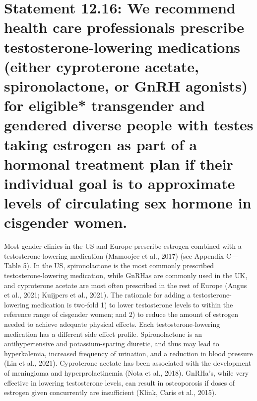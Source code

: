 \documentclass[
]{book}
\begin{document}
\hypertarget{statement-12.16-we-recommend-health-care-professionals-prescribe-testosterone-lowering-medications-either-cyproterone-acetate-spironolactone-or-gnrh-agonists-for-eligible-transgender-and-gendered-diverse-people-with-testes-taking-estrogen-as-part-of-a-hormonal-treatment-plan-if-their-individual-goal-is-to-approximate-levels-of-circulating-sex-hormone-in-cisgender-women.}{%
\section*{Statement 12.16: We recommend health care professionals prescribe testosterone-lowering medications (either cyproterone acetate, spironolactone, or GnRH agonists) for eligible* transgender and gendered diverse people with testes taking estrogen as part of a hormonal treatment plan if their individual goal is to approximate levels of circulating sex hormone in cisgender women.}\label{statement-12.16-we-recommend-health-care-professionals-prescribe-testosterone-lowering-medications-either-cyproterone-acetate-spironolactone-or-gnrh-agonists-for-eligible-transgender-and-gendered-diverse-people-with-testes-taking-estrogen-as-part-of-a-hormonal-treatment-plan-if-their-individual-goal-is-to-approximate-levels-of-circulating-sex-hormone-in-cisgender-women.}}

Most gender clinics in the US and Europe prescribe estrogen combined with a
testosterone-lowering medication (Mamoojee
et al., 2017) (see Appendix C---Table 5). In the
US, spironolactone is the most commonly prescribed testosterone-lowering medication, while
GnRHas are commonly used in the UK, and
cyproterone acetate are most often prescribed in
the rest of Europe (Angus et al., 2021; Kuijpers
et al., 2021). The rationale for adding a
testosterone-lowering medication is two-fold 1)
to lower testosterone levels to within the reference range of cisgender women; and 2) to reduce
the amount of estrogen needed to achieve adequate physical effects. Each testosterone-lowering
medication has a different side effect profile.
Spironolactone is an antihypertensive and
potassium-sparing diuretic, and thus may lead to
hyperkalemia, increased frequency of urination,
and a reduction in blood pressure (Lin et al.,
2021). Cyproterone acetate has been associated
with the development of meningioma and hyperprolactinemia (Nota et al., 2018). GnRHa's, while
very effective in lowering testosterone levels, can
result in osteoporosis if doses of estrogen given
concurrently are insufficient (Klink, Caris
et al., 2015).
\end{document}
